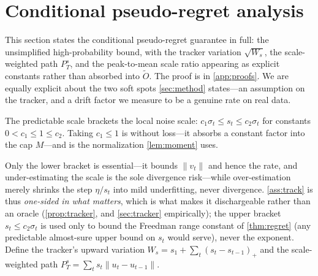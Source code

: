 \documentclass{article}
\newcommand{\norm}[1]{\lVert #1 \rVert}
\begin{document}
\section{Conditional pseudo-regret analysis}
\label{app:regret}

This section states the conditional pseudo-regret guarantee in full: the unsimplified
high-probability bound, with the tracker variation $\sqrt{W_s}$, the scale-weighted path
$P_T^s$, and the peak-to-mean scale ratio appearing as explicit constants rather than absorbed
into $\tilde O$. The proof is in \cref{app:proofs}. We are equally explicit about the two soft
spots \cref{sec:method} states---an assumption on the tracker, and a drift factor we measure to
be a genuine rate on real data.

\begin{assumption}
\label{ass:track}
The predictable scale brackets the local noise scale: $c_1\sigma_t\le s_t\le
c_2\sigma_t$ for constants $0<c_1\le1\le c_2$. Taking $c_1\le1$ is without loss---it absorbs
a constant factor into the cap $M$---and is the normalization \cref{lem:moment} uses.
\end{assumption}
Only the lower bracket is essential---it bounds $\norm{v_t}$ and hence the rate, and
under-estimating the scale is the sole divergence risk---while over-estimation merely
shrinks the step $\eta/s_t$ into mild underfitting, never divergence. \cref{ass:track}
is thus \emph{one-sided in what matters}, which is what makes it dischargeable rather than an
oracle (\cref{prop:tracker}, and \cref{sec:tracker} empirically); the upper bracket
$s_t\le c_2\sigma_t$ is used only to bound the Freedman range constant of \cref{thm:regret}
(any predictable almost-sure upper bound on $s_t$ would serve), never the exponent. Define the tracker's upward
variation $W_s=s_1+\sum_t(s_t-s_{t-1})_+$ and the scale-weighted path
$P_T^s=\sum_t s_t\norm{u_t-u_{t-1}}$.
\end{document}
